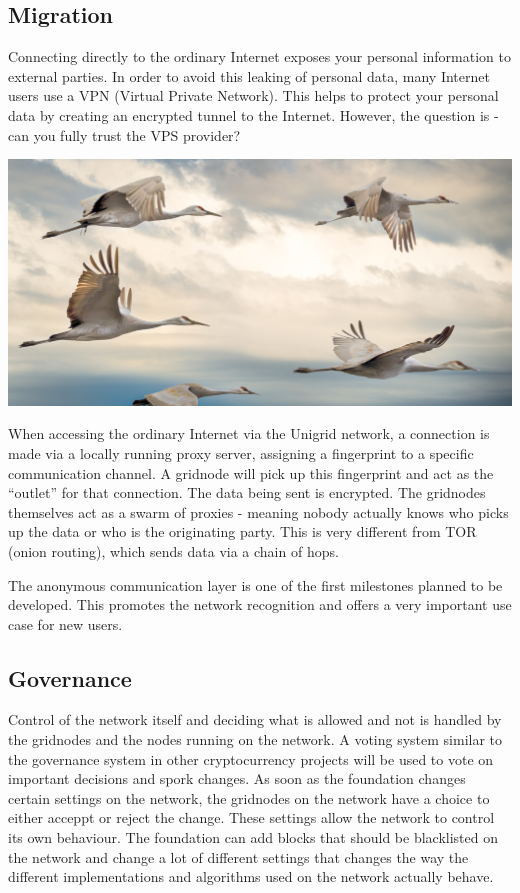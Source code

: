 \documentclass[a4paper,oneside]{article}
\begin{document}
\subsection{Migration}
Connecting directly to the ordinary Internet exposes your personal information to external parties. In order to avoid this leaking of personal data, many Internet users use a VPN (Virtual Private Network). This helps to protect your personal data by creating an encrypted tunnel to the Internet. However, the question is - can you fully trust the VPS provider?

\vspace{0.05cm}
\begin{mdframed}[style=textimage]
	\includegraphics[width=381pt]{migration}
\end{mdframed}

\noindent When accessing the ordinary Internet via the Unigrid network, a connection is made via a locally running proxy server, assigning a fingerprint to a specific communication channel. A gridnode will pick up this fingerprint and act as the “outlet” for that connection. The data being sent is encrypted. The gridnodes themselves act as a swarm of proxies - meaning nobody actually knows who picks up the data or who is the originating party. This is very different from TOR (onion routing), which sends data via a chain of hops.

The anonymous communication layer is one of the first milestones planned to be developed. This promotes the network recognition and offers a very important use case for new users.

\subsection{Governance}
Control of the network itself and deciding what is allowed and not is handled by the gridnodes and the nodes running on the network. A voting system similar to the governance system in other cryptocurrency projects will be used to vote on important decisions and spork changes. As soon as the foundation changes certain settings on the network, the gridnodes on the network have a choice to either acceppt or reject the change. These settings allow the network to control its own behaviour. The foundation can add blocks that should be blacklisted on the network and change a lot of different settings that changes the way the different implementations and algorithms used on the network actually behave.
\end{document}
